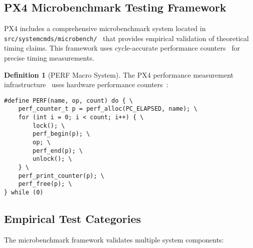 \documentclass[11pt,a4paper]{article}
\theoremstyle{definition}
\newtheorem{definition}[theorem]{Definition}
\theoremstyle{remark}
\begin{document}
\subsection{PX4 Microbenchmark Testing Framework}

PX4 includes a comprehensive microbenchmark system located in \texttt{src/systemcmds/microbench/}~\cite{px4_microbench} that provides empirical validation of theoretical timing claims. This framework uses cycle-accurate performance counters~\cite{stm32h7_perf_counters,px4_perf} for precise timing measurements.

\begin{definition}[PERF Macro System]
The PX4 performance measurement infrastructure~\cite{px4_perf} uses hardware performance counters~\cite{stm32h7_perf_counters}:
\begin{verbatim}
#define PERF(name, op, count) do { \
    perf_counter_t p = perf_alloc(PC_ELAPSED, name); \
    for (int i = 0; i < count; i++) { \
        lock(); \
        perf_begin(p); \
        op; \
        perf_end(p); \
        unlock(); \
    } \
    perf_print_counter(p); \
    perf_free(p); \
} while (0)
\end{verbatim}
\end{definition}

\subsection{Empirical Test Categories}

The microbenchmark framework validates multiple system components:
\end{document}

